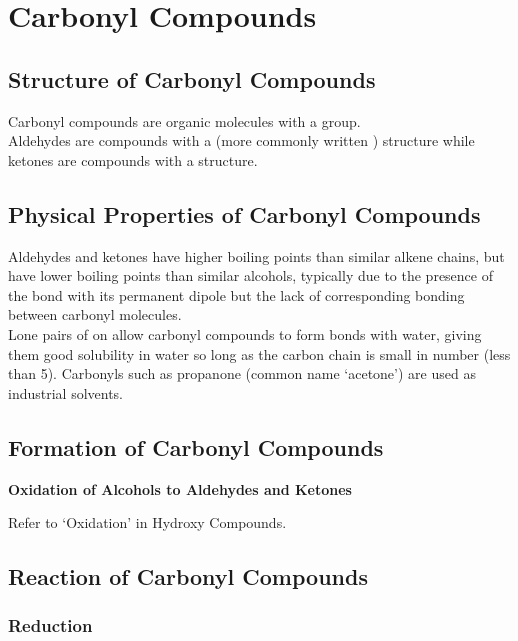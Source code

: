\documentclass[../main]{subfiles}
\begin{document}
\section{Carbonyl Compounds}

	\subsection{Structure of Carbonyl Compounds}

	Carbonyl compounds are organic molecules with a  group. \\

	Aldehydes are compounds with a  (more commonly written ) structure while ketones are compounds with a  structure. \\

	\subsection{Physical Properties of Carbonyl Compounds}

	Aldehydes and ketones have higher boiling points than similar alkene chains, but have lower boiling points than similar alcohols, typically due to the presence of the  bond with its permanent dipole but the lack of corresponding  bonding between carbonyl molecules. \\

	Lone pairs of  on  allow carbonyl compounds to form  bonds with water, giving them good solubility in water so long as the carbon chain is small in number (less than 5). Carbonyls such as propanone (common name `acetone') are used as industrial solvents.

	\subsection{Formation of Carbonyl Compounds}

	\noindent \textbf{Oxidation of Alcohols to Aldehydes and Ketones}

	Refer to `Oxidation' in Hydroxy Compounds. \\ 

	\subsection{Reaction of Carbonyl Compounds}

	\subsubsection{Reduction}
\end{document}
